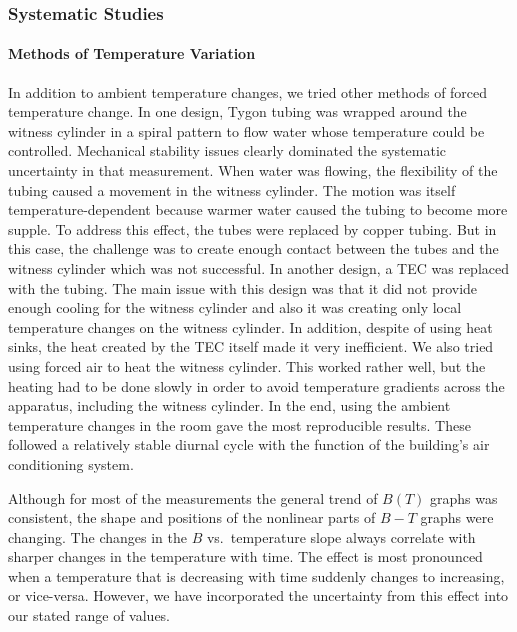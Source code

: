\subsubsection{Systematic Studies\label{sec:axialsyst}}

\paragraph{Methods of Temperature Variation}

In addition to ambient temperature changes, we tried other methods of
forced temperature change.  In one design, Tygon tubing was wrapped
around the witness cylinder in a spiral pattern to flow water whose
temperature could be controlled.  Mechanical stability issues clearly
dominated the systematic uncertainty in that measurement.  When water
was flowing, the flexibility of the tubing caused a movement in the
witness cylinder.  The motion was itself temperature-dependent because
warmer water caused the tubing to become more supple.  To address this
effect, the tubes were replaced by copper tubing.  But in this case,
the challenge was to create enough contact between the tubes and the
witness cylinder which was not successful. In another design, a TEC
was replaced with the tubing. The main issue with this design was that
it did not provide enough cooling for the witness cylinder and also it
was creating only local temperature changes on the witness
cylinder. In addition, despite of using heat sinks, the heat created
by the TEC itself made it very inefficient.  We also tried using
forced air to heat the witness cylinder.  This worked rather well, but
the heating had to be done slowly in order to avoid temperature
gradients across the apparatus, including the witness cylinder.  In
the end, using the ambient temperature changes in the room gave the
most reproducible results.  These followed a relatively stable diurnal
cycle with the function of the building's air conditioning system.

Although for most of the measurements the general trend of $B(T)$
graphs was consistent, the shape and positions of the nonlinear parts
of $B-T$ graphs were changing.  The changes in the $B$ vs.~temperature
slope always correlate with sharper changes in the temperature with
time.  The effect is most pronounced when a temperature that is
decreasing with time suddenly changes to increasing, or vice-versa.
However, we have incorporated the uncertainty from this effect into
our stated range of values.




